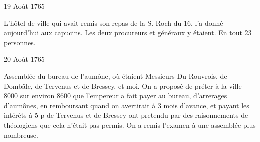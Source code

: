                      \begin{diary}{19 Août 1765}{}


                           L'hôtel de ville qui avait remis son
                           repas
                           de la S. Roch
                           du 16, l'a donné aujourd'hui
                           aux capucins. Les deux procureurs et généraux
                           y étaient. En tout 23 personnes. \bigskip


                     \end{diary}

                     \begin{diary}{20 Août 1765}{}

                         Assemblée du bureau de l'aumône, où
                           étaient Messieurs
                           Du Rouvrois, de Dombâle, de
                              Tervenus et de
                              Bressey, et moi. On a
                           proposé
                           de préter à la ville 8000 sur environ 8600 que l'empereur a fait payer au bureau, d'arrerages
                           d'aumônes, en remboursant quand on avertirait
                           à 3 mois d'avance, et payant les intérêts à
                           5 p %
                           de Tervenus et de
                              Bressey ont pretendu par des raisonnements de
                           théologiens que cela n'était pas permis. On a
                           remis l'examen à une assemblée plus nombreuse. \bigskip


                     \end{diary}

